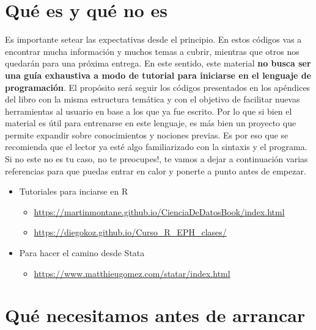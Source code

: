 \documentclass[
]{book}
\providecommand{\tightlist}{%
  \setlength{\itemsep}{0pt}\setlength{\parskip}{0pt}}
\begin{document}
\hypertarget{quuxe9-es-y-quuxe9-no-es}{%
\section*{Qué es y qué no es}\label{quuxe9-es-y-quuxe9-no-es}}

Es importante setear las expectativas desde el principio. En estos códigos vas a encontrar mucha información y muchos temas a cubrir, mientras que otros nos quedarán para una próxima entrega. En este sentido, este material \textbf{no busca ser una guía exhaustiva a modo de tutorial para iniciarse en el lenguaje de programación}. El propósito será seguir los códigos presentados en los apéndices del libro con la misma estructura temática y con el objetivo de facilitar nuevas herramientas al usuario en base a los que ya fue escrito. Por lo que si bien el material es útil para entrenarse en este lenguaje, es más bien un proyecto que permite expandir sobre conocimientos y nociones previas. Es por eso que se recomienda que el lector ya esté algo familiarizado con la sintaxis y el programa. Si no este no es tu caso, no te preocupes!, te vamos a dejar a continuación varias referencias para que puedas entrar en calor y ponerte a punto antes de empezar.

\begin{itemize}
\item
  Tutoriales para inciarse en R

  \begin{itemize}
  \item
    \url{https://martinmontane.github.io/CienciaDeDatosBook/index.html}
  \item
    \url{https://diegokoz.github.io/Curso_R_EPH_clases/}
  \end{itemize}
\item
  Para hacer el camino desde Stata

  \begin{itemize}
  \tightlist
  \item
    \url{https://www.matthieugomez.com/statar/index.html}
  \end{itemize}
\end{itemize}

\hypertarget{quuxe9-necesitamos-antes-de-arrancar}{%
\section*{Qué necesitamos antes de arrancar}\label{quuxe9-necesitamos-antes-de-arrancar}}
\end{document}
